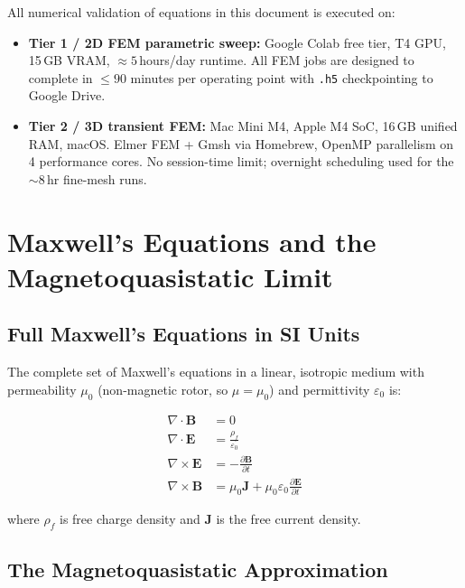 \documentclass[12pt, a4paper]{article}
\theoremstyle{plain}
\theoremstyle{definition}
\newcommand{\vB}{\mathbf{B}}
\newcommand{\vE}{\mathbf{E}}
\newcommand{\vJ}{\mathbf{J}}
\newcommand{\muZ}{\mu_0}
\newcommand{\Der}[2]{\frac{\partial #1}{\partial #2}}
\begin{document}
\begin{tcolorbox}[colback=blue!5, colframe=blue!40, title=\textbf{Compute Platform Note}]
All numerical validation of equations in this document is executed on:
\begin{itemize}
  \item \textbf{Tier 1 / 2D FEM parametric sweep:} Google Colab free tier, T4 GPU,
        15\,GB VRAM, $\approx 5$\,hours/day runtime. All FEM jobs are designed to
        complete in $\leq 90$ minutes per operating point with \texttt{.h5} checkpointing
        to Google Drive.
  \item \textbf{Tier 2 / 3D transient FEM:} Mac Mini M4, Apple M4 SoC,
        16\,GB unified RAM, macOS. Elmer FEM + Gmsh via Homebrew, OpenMP
        parallelism on 4 performance cores. No session-time limit; overnight scheduling
        used for the $\sim 8$\,hr fine-mesh runs.
\end{itemize}
\end{tcolorbox}


\section{Maxwell's Equations and the Magnetoquasistatic Limit}
\label{sec:maxwell}

\subsection{Full Maxwell's Equations in SI Units}

The complete set of Maxwell's equations in a linear, isotropic medium with permeability
$\muZ$ (non-magnetic rotor, so $\mu = \muZ$) and permittivity $\varepsilon_0$ is:

\begin{align}
  \nabla \cdot \vB &= 0 \label{eq:divB}\\
  \nabla \cdot \vE &= \frac{\rho_f}{\varepsilon_0} \label{eq:divE}\\
  \nabla \times \vE &= -\Der{\vB}{t} \label{eq:faraday}\\
  \nabla \times \vB &= \muZ \vJ + \muZ \varepsilon_0 \Der{\vE}{t} \label{eq:ampere}
\end{align}

where $\rho_f$ is free charge density and $\vJ$ is the free current density.

\subsection{The Magnetoquasistatic Approximation}
\end{document}
